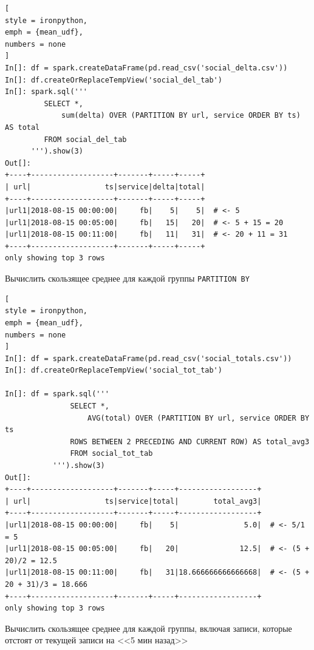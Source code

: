 \documentclass[%
	11pt,
	a4paper,
	utf8,
		]{article}
\begin{document}
\begin{lstlisting}[
style = ironpython,
emph = {mean_udf},
numbers = none
]
In[]: df = spark.createDataFrame(pd.read_csv('social_delta.csv'))
In[]: df.createOrReplaceTempView('social_del_tab')
In[]: spark.sql('''
         SELECT *,
             sum(delta) OVER (PARTITION BY url, service ORDER BY ts) AS total
         FROM social_del_tab 
      ''').show(3)
Out[]:
+----+-------------------+-------+-----+-----+
| url|                 ts|service|delta|total|
+----+-------------------+-------+-----+-----+
|url1|2018-08-15 00:00:00|     fb|    5|    5|  # <- 5
|url1|2018-08-15 00:05:00|     fb|   15|   20|  # <- 5 + 15 = 20
|url1|2018-08-15 00:11:00|     fb|   11|   31|  # <- 20 + 11 = 31
+----+-------------------+-------+-----+-----+
only showing top 3 rows
\end{lstlisting}

Вычислить скользящее среднее для каждой группы \texttt{PARTITION BY}

\begin{lstlisting}[
style = ironpython,
emph = {mean_udf},
numbers = none
]
In[]: df = spark.createDataFrame(pd.read_csv('social_totals.csv'))
In[]: df.createOrReplaceTempView('social_tot_tab')

In[]: df = spark.sql('''
               SELECT *,
                   AVG(total) OVER (PARTITION BY url, service ORDER BY ts
               ROWS BETWEEN 2 PRECEDING AND CURRENT ROW) AS total_avg3
               FROM social_tot_tab
           ''').show(3)
Out[]:
+----+-------------------+-------+-----+------------------+
| url|                 ts|service|total|        total_avg3|
+----+-------------------+-------+-----+------------------+
|url1|2018-08-15 00:00:00|     fb|    5|               5.0|  # <- 5/1 = 5
|url1|2018-08-15 00:05:00|     fb|   20|              12.5|  # <- (5 + 20)/2 = 12.5
|url1|2018-08-15 00:11:00|     fb|   31|18.666666666666668|  # <- (5 + 20 + 31)/3 = 18.666
+----+-------------------+-------+-----+------------------+
only showing top 3 rows
\end{lstlisting}

Вычислить скользящее среднее для каждой группы, включая записи, которые отстоят от текущей записи на <<5 мин назад>>
\end{document}
